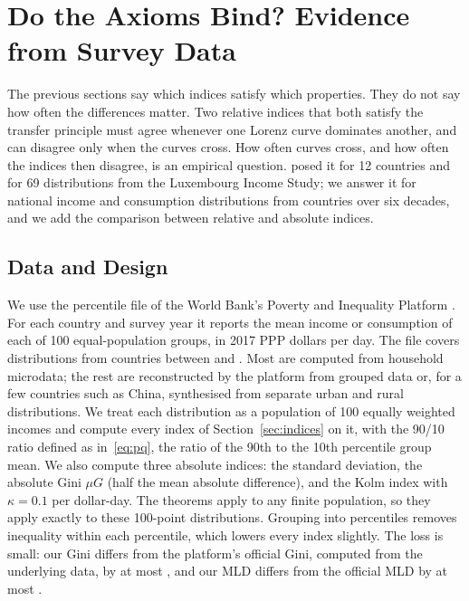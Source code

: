 \documentclass[12pt]{article}
\theoremstyle{plain}
\theoremstyle{definition}
\theoremstyle{remark}
\begin{document}
\section{Do the Axioms Bind? Evidence from Survey Data}\label{sec:empirics}

The previous sections say which indices satisfy which properties.
They do not say how often the differences matter.
Two relative indices that both satisfy the transfer principle must agree whenever one Lorenz curve dominates another, and can disagree only when the curves cross.
How often curves cross, and how often the indices then disagree, is an empirical question.
\citet{Atkinson1970} posed it for 12 countries and \citet{Figini2000} for 69 distributions from the Luxembourg Income Study; we answer it for national income and consumption distributions from \PipCountries{} countries over six decades, and we add the comparison between relative and absolute indices.

\subsection{Data and Design}

We use the percentile file of the World Bank's Poverty and Inequality Platform \citep{WorldBankPIP2026,WorldBankPIPPercentiles2026}.
For each country and survey year it reports the mean income or consumption of each of 100 equal-population groups, in 2017 PPP dollars per day.
The file covers \PipDistributions{} distributions from \PipDistCountries{} countries between \PipYearMin{} and \PipYearMax{}.
Most are computed from household microdata; the rest are reconstructed by the platform from grouped data or, for a few countries such as China, synthesised from separate urban and rural distributions.
We treat each distribution as a population of 100 equally weighted incomes and compute every index of Section~\ref{sec:indices} on it, with the 90/10 ratio defined as in~\eqref{eq:pq}, the ratio of the 90th to the 10th percentile group mean.
We also compute three absolute indices: the standard deviation, the absolute Gini $\mu G$ (half the mean absolute difference), and the Kolm index with $\kappa = 0.1$ per dollar-day.
The theorems apply to any finite population, so they apply exactly to these 100-point distributions.
Grouping into percentiles removes inequality within each percentile, which lowers every index slightly.
The loss is small: our Gini differs from the platform's official Gini, computed from the underlying data, by at most \PipGiniMaxDiff{}, and our MLD differs from the official MLD by at most \PipMldMaxDiff{}.
\end{document}
